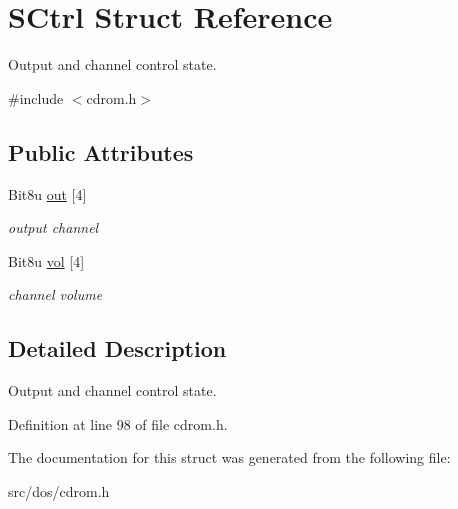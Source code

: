 \hypertarget{structSCtrl}{\section{S\-Ctrl Struct Reference}
\label{structSCtrl}
}


Output and channel control state.  




{\ttfamily \#include $<$cdrom.\-h$>$}

\subsection*{Public Attributes}
\begin{DoxyCompactItemize}
\item 
\hypertarget{structSCtrl_a5b5415593005d9a11a35d11e8bbdd8b3}{Bit8u \hyperlink{structSCtrl_a5b5415593005d9a11a35d11e8bbdd8b3}{out} \mbox{[}4\mbox{]}}\label{structSCtrl_a5b5415593005d9a11a35d11e8bbdd8b3}

\begin{DoxyCompactList}\small\item\em output channel \end{DoxyCompactList}\item 
\hypertarget{structSCtrl_ad029c2b75bd84b09cfe3f893ba6a5004}{Bit8u \hyperlink{structSCtrl_ad029c2b75bd84b09cfe3f893ba6a5004}{vol} \mbox{[}4\mbox{]}}\label{structSCtrl_ad029c2b75bd84b09cfe3f893ba6a5004}

\begin{DoxyCompactList}\small\item\em channel volume \end{DoxyCompactList}\end{DoxyCompactItemize}


\subsection{Detailed Description}
Output and channel control state. 

Definition at line 98 of file cdrom.\-h.



The documentation for this struct was generated from the following file\-:\begin{DoxyCompactItemize}
\item 
src/dos/cdrom.\-h\end{DoxyCompactItemize}
